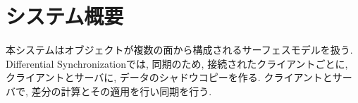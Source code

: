 \chapter{システム概要}
本システムはオブジェクトが複数の面から構成されるサーフェスモデルを扱う. Differential Synchronizationでは, 同期のため, 接続されたクライアントごとに, クライアントとサーバに, データのシャドウコピーを作る. クライアントとサーバで, 差分の計算とその適用を行い同期を行う.
